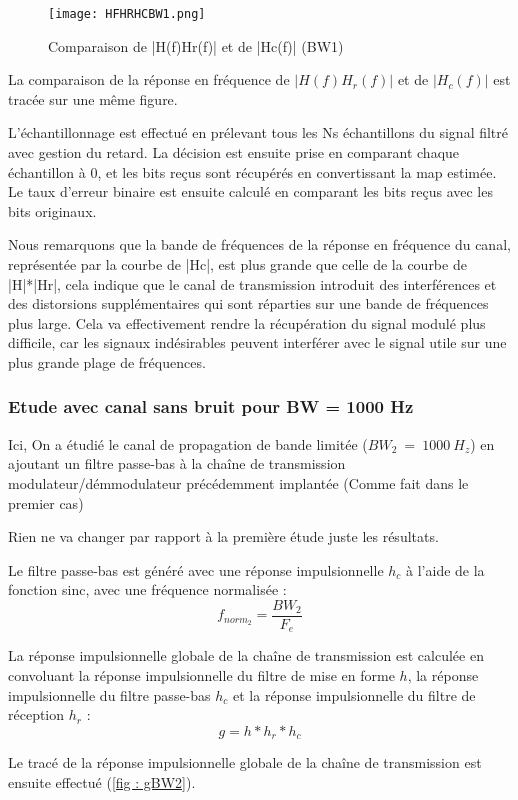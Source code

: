 \documentclass[11pt]{article}
\begin{document}
\begin{figure}[ht!]
            \centering
            \texttt{[image: HFHRHCBW1.png]}
            \caption{Comparaison de |H(f)Hr(f)| et de |Hc(f)| (BW1)\label{fig : HFHRHCBW1}}
\end{figure}

La comparaison de la réponse en fréquence de $|H(f)H_r(f)|$ et de $|H_c(f)|$ est tracée sur une même figure.

L'échantillonnage est effectué en prélevant tous les Ns échantillons du signal filtré avec gestion du retard. La décision est ensuite prise en comparant chaque échantillon à 0, et les bits reçus sont récupérés en convertissant la map estimée. Le taux d'erreur binaire est ensuite calculé en comparant les bits reçus avec les bits originaux.

Nous remarquons que la bande de fréquences de la réponse en fréquence du canal, représentée par la courbe de |Hc|, est plus grande que celle de la courbe de |H|*|Hr|, cela indique que le canal de transmission introduit des interférences et des distorsions supplémentaires qui sont réparties sur une bande de fréquences plus large. Cela va effectivement rendre la récupération du signal modulé plus difficile, car les signaux indésirables peuvent interférer avec le signal utile sur une plus grande plage de fréquences.

    \subsubsection{Etude avec canal sans bruit pour BW = 1000 Hz}

    Ici, On a étudié le canal de propagation de bande limitée ($BW_2 \ = \ 1000 \ H_z$) en ajoutant un filtre passe-bas à la chaîne de transmission modulateur/démmodulateur précédemment implantée (Comme fait dans le premier cas)

Rien ne va changer par rapport à la première étude juste les résultats.

Le filtre passe-bas est généré avec une réponse impulsionnelle $h_c$ à l'aide de la fonction sinc, avec une fréquence normalisée :
$$f_{norm_2} = \frac{BW_2}{F_e}$$

La réponse impulsionnelle globale de la chaîne de transmission est calculée en convoluant la réponse impulsionnelle du filtre de mise en forme $h$, la réponse impulsionnelle du filtre passe-bas $h_c$ et la réponse impulsionnelle du filtre de réception $h_r$ :
$$ g = h * h_r *h_c$$

Le tracé de la réponse impulsionnelle globale de la chaîne de transmission est ensuite effectué (\ref{fig : gBW2}).
\end{document}

